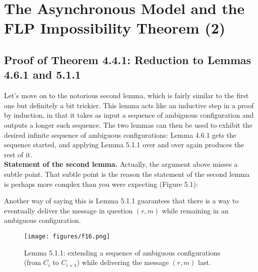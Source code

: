 \newpage
\chapter{The Asynchronous Model and the FLP Impossibility Theorem (2)}
\section{Proof of Theorem 4.4.1: Reduction to Lemmas 4.6.1 and 5.1.1}
Let’s move on to the notorious second lemma, which is fairly similar to the first one but
definitely a bit trickier. This lemma acts like an inductive step in a proof by induction, in that it takes as input a sequence of ambiguous configuration and outputs a longer such sequence. The two lemmas can then be used to exhibit the desired infinite sequence of
ambiguous configurations: Lemma 4.6.1 gets the sequence started, and applying Lemma 5.1.1 over and over again produces the rest of it.\\

\noindent
\textbf{Statement of the second lemma.} Actually, the argument above misses a subtle point.
That subtle point is the reason the statement of the second lemma is perhaps more complex
than you were expecting (Figure 5.1):


Another way of saying this is Lemma 5.1.1 guarantees that
there is a way to eventually deliver the
message in question $(r,m)$
while remaining in an ambiguous configuration. 
\begin{figure}[h]
    \centering
    \texttt{[image: figures/f16.png]}
    \caption{ Lemma 5.1.1: extending a sequence of ambiguous configurations (from $C_i$ to $C_{i+1}$) while delivering the message $(r, m)$ last.}
    \label{fig:mesh1}
\end{figure}\\


